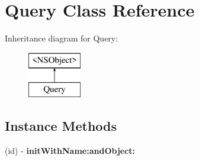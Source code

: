 \hypertarget{interface_query}{\section{Query Class Reference}
\label{interface_query}
}
Inheritance diagram for Query\-:\begin{figure}[H]
\begin{center}
\leavevmode
\includegraphics[height=2.000000cm]{interface_query}
\end{center}
\end{figure}
\subsection*{Instance Methods}
\begin{DoxyCompactItemize}
\item 
\hypertarget{interface_query_a9b90bc78e3f29d9eed0f66a517e95ab0}{(id) -\/ {\bfseries init\-With\-Name\-:and\-Object\-:}}\label{interface_query_a9b90bc78e3f29d9eed0f66a517e95ab0}

\end{DoxyCompactItemize}
